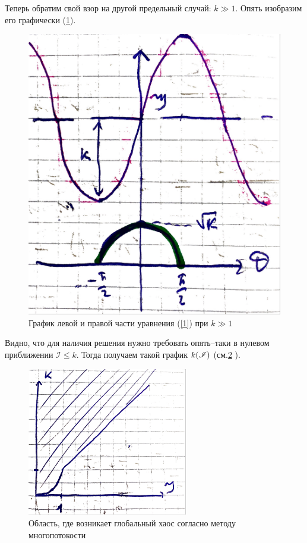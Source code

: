 \documentclass[a4paper,9pt,russian]{article}
\newcommand{\I}{\mathscr{I}}
\renewcommand{\-}{\bar}
\begin{document}
\par
Теперь обратим свой взор на другой предельный случай: $k \gg 1$. Опять изобразим его графически (\ref{graf2}).
\begin{figure}[h]
 \centering
 \includegraphics[width = 70 mm]{graf/graf2.JPG}
 \caption{График левой и правой части уравнения (\ref{1}) при $k \gg 1$}
 \label{graf2}
\end{figure}
\par
Видно, что для наличия решения нужно требовать опять--таки в нулевом приближении $\I \le k$. Тогда получаем такой график $k \qty(\I)$ (см.\ref{graf3} ).
\begin{figure}
 \centering
 \includegraphics[width = 70mm]{graf/graf3.JPG}
 \caption{Область, где возникает глобальный хаос согласно методу многопотокости}
 \label{graf3}
\end{figure}
\end{document}
